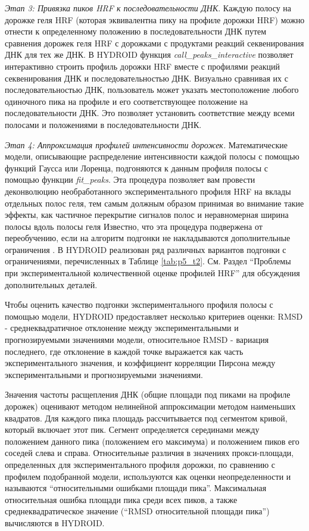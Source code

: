     \emph{Этап 3: Привязка пиков HRF к последовательности ДНК}. Каждую полосу на дорожке геля HRF (которая эквивалентна пику на профиле дорожки HRF) можно отнести к определенному положению в последовательности ДНК путем сравнения дорожек геля HRF с дорожками с продуктами реакций секвенирования ДНК для тех же ДНК. В HYDROID функция \textit{call\_peaks\_interactive} позволяет интерактивно строить профиль дорожки HRF вместе с профилями реакций секвенирования ДНК и последовательностью ДНК. Визуально сравнивая их с последовательностью ДНК, пользователь может указать местоположение любого одиночного пика на профиле и его соответствующее положение на последовательности ДНК. Это позволяет установить соответствие между всеми полосами и положениями в последовательности ДНК.

    \emph{Этап 4: Аппроксимация профилей интенсивности дорожек.} Математические модели, описывающие распределение интенсивности каждой полосы с помощью функций Гаусса или Лоренца, подгоняются к данным профиля полосы с помощью функции \textit{fit\_peaks}. Эта процедура позволяет вам провести деконволюцию необработанного экспериментального профиля HRF на вклады отдельных полос геля, тем самым должным образом принимая во внимание такие эффекты, как частичное перекрытие сигналов полос и неравномерная ширина полосы вдоль полосы геля 
    Известно, что эта процедура подвержена от переобучению, если на алгоритм подгонки не накладываются дополнительные ограничения \cite{takamoto_semi-automated_2004}. В HYDROID реализован ряд различных вариантов подгонки с ограничениями, перечисленных в Таблице \ref{tab:p5_t2}. См. Раздел ``Проблемы при экспериментальной количественной оценке профилей HRF'' для обсуждения дополнительных деталей.

    Чтобы оценить качество подгонки экспериментального профиля полосы с помощью модели, HYDROID предоставляет несколько критериев оценки: RMSD - среднеквадратичное отклонение между экспериментальными и прогнозируемыми значениями модели, относительное RMSD - вариация последнего, где отклонение в каждой точке выражается как часть экспериментального значения, и коэффициент корреляции Пирсона между экспериментальными и прогнозируемыми значениями.

    Значения частоты расщепления ДНК (общие площади под пиками на профиле дорожек) оценивают методом нелинейной аппроксимации методом наименьших квадратов. Для каждого пика площадь рассчитывается под сегментом кривой, который включает этот пик. Сегмент определяется серединами между положением данного пика (положением его максимума) и положением пиков его соседей слева и справа. Относительные различия в значениях прокси-площади, определенных для экспериментального профиля дорожки, по сравнению с профилем подобранной модели, используются как оценки неопределенности и называются ``относительными ошибками площади пика''. Максимальная относительная ошибка площади пика среди всех пиков, а также среднеквадратическое значение (``RMSD относительной площади пика'') вычисляются в HYDROID.
    
